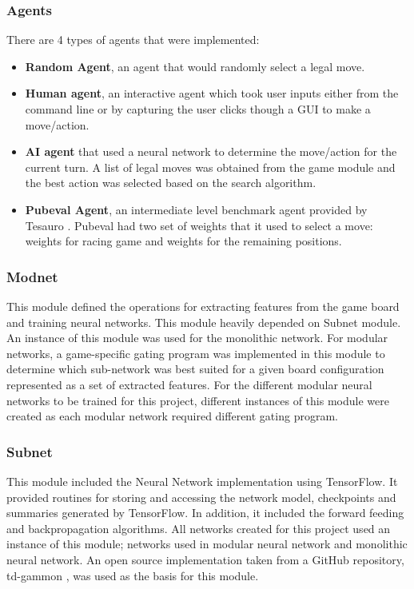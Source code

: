 \documentclass[12pt,a4paper]{article}
\begin{document}
\subsubsection{Agents}
There are 4 types of agents that were implemented: 
\begin{itemize}
    \item \textbf{Random Agent}, an agent that would randomly select a legal move.
    \item \textbf{Human agent}, an interactive agent which took user inputs either from the command line or by capturing the user clicks though a GUI to make a move/action.
    \item \textbf{AI agent} that used a neural network to determine the move/action for the current turn. A list of legal moves was obtained from the game module and the best action was selected based on the search algorithm.
    \item \textbf{Pubeval Agent}, an intermediate level benchmark agent provided by Tesauro \citeyear{pubeval}. Pubeval had two set of weights that it used to select a move: weights for racing game and weights for the remaining positions. 
\end{itemize}

\subsubsection{Modnet}
This module defined the operations for extracting features from the game board and training neural networks. This module heavily depended on Subnet module. An instance of this module was used for the monolithic network. For modular networks, a game-specific gating program was implemented in this module to determine which sub-network was best suited for a given board configuration represented as a set of extracted features. For the different modular neural networks to be trained for this project, different instances of this module were created as each modular network required different gating program.

\subsubsection{Subnet}
This module included the Neural Network implementation using TensorFlow. It provided routines for storing and accessing the network model, checkpoints and summaries generated by TensorFlow. In addition, it included the forward feeding and backpropagation algorithms. All networks created for this project used an instance of this module; networks used in modular neural network and monolithic neural network. An open source implementation taken from a GitHub repository, td-gammon \cite{fomorians}, was used as the basis for this module. 
\end{document}
